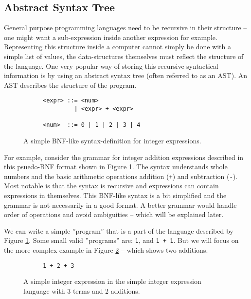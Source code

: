 \subsection{Abstract Syntax Tree}
General purpose programming languages need to be recursive in their structure -- one might want a sub-expression inside another expression for example. Representing this structure inside a computer cannot simply be done with a simple list of values, the data-structures themselves must reflect the structure of the language. One very popular way of storing this recursive syntactical information is by using an abstract syntax tree (often referred to as an AST). An AST describes the structure of the program.


\begin{figure}
\centering
\begin{subfigure}{.5\textwidth}
\begin{verbatim}
<expr> ::= <num>
         | <expr> + <expr>

<num>  ::= 0 | 1 | 2 | 3 | 4
\end{verbatim}
\end{subfigure}
  \caption{A simple BNF-like syntax-definition for integer expressions.}
  \label{fig:bnfExpr}
\end{figure}
For example, consider the grammar for integer addition expressions described in this psuedo-BNF format shown in Figure \ref{fig:bnfExpr}. The syntax understands whole numbers and the basic arithmetic operations addition (\verb!+!) and subtraction (\verb!-!). Most notable is that the syntax is recursive and expressions can contain expressions in themselves. This BNF-like syntax is a bit simplified and the grammar is not necessarily in a good format. A better grammar would handle order of operations and avoid ambiguities -- which will be explained later.

We can write a simple ''program'' that is a part of the language described by Figure \ref{fig:bnfExpr}. Some small valid ''programs'' are: \verb+1+, and \verb!1 + 1!. But we will focus on the more complex example in Figure \ref{fig:progExpr} -- which shows two additions.

\begin{figure}
\centering
\begin{subfigure}{.5\textwidth}
\begin{verbatim}
1 + 2 + 3
\end{verbatim}
\end{subfigure}
  \caption{A simple integer expression in the simple integer expression language with 3 terms and 2 additions.}
  \label{fig:progExpr}
\end{figure}

